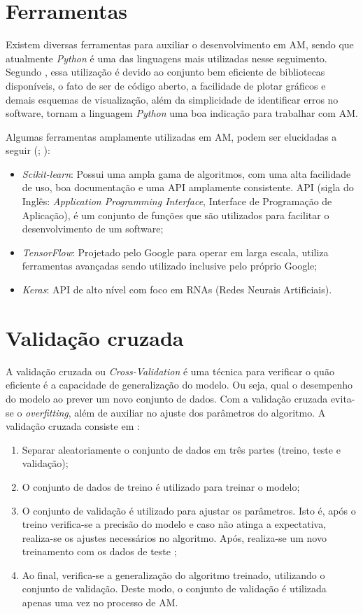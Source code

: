 \section{Ferramentas}
\label{sec:MAFerramentas}
Existem diversas ferramentas para auxiliar o desenvolvimento em AM, sendo que atualmente \textit{Python} é uma das linguagens mais utilizadas nesse seguimento. Segundo , essa utilização é devido ao conjunto bem eficiente de bibliotecas disponíveis, o fato de ser de código aberto, a facilidade de plotar gráficos e demais esquemas de visualização, além da simplicidade de identificar erros no software, tornam a linguagem \textit{Python} uma boa indicação para trabalhar com AM.

Algumas ferramentas amplamente utilizadas em AM, podem ser elucidadas a seguir (\cite{scikitlearn}; \cite{abadi2016tensorflow}):
\begin{itemize}
    \item \textit{Scikit-learn}: Possui uma ampla gama de algoritmos, com uma alta facilidade de uso, boa documentação e uma API amplamente consistente. API (sigla do Inglês: \textit{Application Programming Interface}, Interface de Programação de Aplicação), é um conjunto de funções que são utilizados para facilitar o desenvolvimento de um software;
    \item \textit{TensorFlow}: Projetado pelo Google para operar em larga escala, utiliza ferramentas avançadas sendo utilizado inclusive pelo próprio Google;
    \item \textit{Keras}: API de alto nível com foco em RNAs (Redes Neurais Artificiais).
\end{itemize}

\section{Validação cruzada}
\label{sc:crossvalidation}
A validação cruzada ou \textit{Cross-Validation} é uma técnica para verificar o quão eficiente é a capacidade de generalização do modelo. Ou seja, qual o desempenho do modelo ao prever um novo conjunto de dados. Com a validação cruzada evita-se o \textit{overfitting}, além de auxiliar no ajuste dos parâmetros do algoritmo. A validação cruzada consiste em \cite{james2013introduction}:

\begin{enumerate}
    \item Separar aleatoriamente o conjunto de dados em três partes (treino, teste e validação);
    \item O conjunto de dados de treino é utilizado para treinar o modelo;
    \item O conjunto de validação é utilizado para ajustar os parâmetros. Isto é, após o treino verifica-se a precisão do modelo e caso não atinga a expectativa, realiza-se os ajustes necessários no algoritmo. Após, realiza-se um novo treinamento com os dados de teste \cite{raschka2015python};
    \item Ao final, verifica-se a generalização do algoritmo treinado, utilizando o conjunto de validação. Deste modo, o conjunto de validação é utilizada apenas uma vez no processo de AM.
\end{enumerate}

